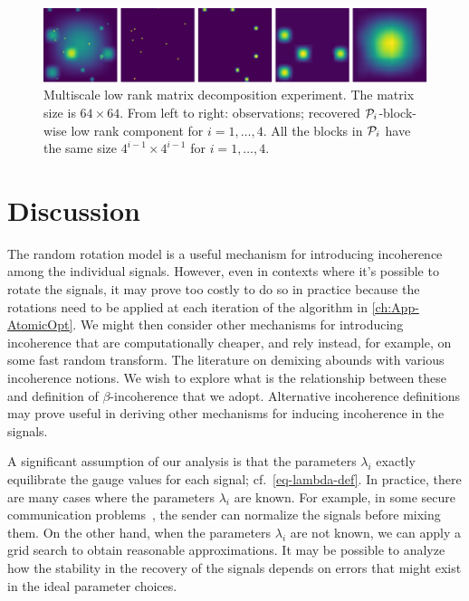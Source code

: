 \begin{figure}[t]
    \centering
    \includegraphics[width=\textwidth]{./figures/Multiscale.pdf}
    \caption{Multiscale low rank matrix decomposition experiment. The matrix size is $64\times64$. From left to right: observations; recovered $\mathcal{P}_i$-block-wise low rank component for $i = 1,\dots,4$. All the blocks in $\mathcal{P}_i$ have the same size $4^{i-1}\times4^{i-1}$ for $i = 1,\dots,4$.}
    \label{fig:multiscale}
\end{figure}

\section{Discussion}\label{sec:3-6}

The random rotation model is a useful mechanism for introducing incoherence among the individual signals. However, even in contexts where it's possible to rotate the signals, it may prove too costly to do so in practice because the rotations need to be applied at each iteration of the algorithm in \autoref{ch:App-AtomicOpt}. We might then consider other mechanisms for introducing incoherence that are computationally cheaper, and rely instead, for example, on some fast random transform. The literature on demixing abounds with various incoherence notions. We wish to explore what is the relationship between these and definition of $\beta$-incoherence that we adopt. Alternative incoherence definitions may prove useful in deriving other mechanisms for inducing incoherence in the signals. 

A significant assumption of our analysis is that the parameters $\lambda_i$ exactly equilibrate the gauge values for each signal; cf.~\eqref{eq-lambda-def}. In practice, there are many cases where the parameters $\lambda_i$ are known. For example, in some secure communication problems~\cite[Section~1.3.1]{mccoy2014sharp}, the sender can normalize the signals before mixing them. On the other hand, when the parameters $\lambda_i$ are not known, we can apply a grid search to obtain reasonable approximations. It may be possible to analyze how the stability in the recovery of the signals depends on errors that might exist in the ideal parameter choices.


